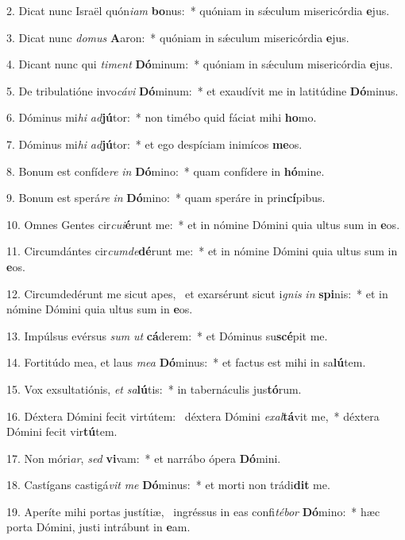 2. Dicat nunc Israël quón\textit{i}\textit{am} \textbf{bo}nus:~*  quóniam in sǽculum misericórdia \textbf{e}jus.\

3. Dicat nunc \textit{do}\textit{mus} \textbf{A}aron:~*  quóniam in sǽculum misericórdia \textbf{e}jus.\

4. Dicant nunc qui \textit{ti}\textit{ment} \textbf{Dó}minum:~*  quóniam in sǽculum misericórdia \textbf{e}jus.\

5. De tribulatióne invo\textit{cá}\textit{vi} \textbf{Dó}minum:~*  et exaudívit me in latitúdine \textbf{Dó}minus.\

6. Dóminus mi\textit{hi} \textit{ad}\textbf{jú}tor:~*  non timébo quid fáciat mihi \textbf{ho}mo.\

7. Dóminus mi\textit{hi} \textit{ad}\textbf{jú}tor:~*  et ego despíciam inimícos \textbf{me}os.\

8. Bonum est confíde\textit{re} \textit{in} \textbf{Dó}mino:~*  quam confídere in \textbf{hó}mine.\

9. Bonum est sperá\textit{re} \textit{in} \textbf{Dó}mino:~*  quam speráre in prin\textbf{cí}pibus.\

10. Omnes Gentes cir\textit{cu}\textit{i}\textbf{é}runt me:~*  et in nómine Dómini quia ultus sum in \textbf{e}os.\

11. Circumdántes cir\textit{cum}\textit{de}\textbf{dé}runt me:~*  et in nómine Dómini quia ultus sum in \textbf{e}os.\

12. Circumdedérunt me sicut apes, \dag\  et exarsérunt sicut i\textit{gnis} \textit{in} \textbf{spi}nis:~*  et in nómine Dómini quia ultus sum in \textbf{e}os.\

13. Impúlsus evérsus \textit{sum} \textit{ut} \textbf{cá}derem:~*  et Dóminus su\textbf{scé}pit me.\

14. Fortitúdo mea, et laus \textit{me}\textit{a} \textbf{Dó}minus:~*  et factus est mihi in sa\textbf{lú}tem.\

15. Vox exsultatiónis, \textit{et} \textit{sa}\textbf{lú}tis:~*  in tabernáculis jus\textbf{tó}rum.\

16. Déxtera Dómini fecit virtútem: \dag\  déxtera Dómini \textit{ex}\textit{al}\textbf{tá}vit me,~*  déxtera Dómini fecit vir\textbf{tú}tem.\

17. Non móri\textit{ar}, \textit{sed} \textbf{vi}vam:~*  et narrábo ópera \textbf{Dó}mini.\

18. Castígans castigá\textit{vit} \textit{me} \textbf{Dó}minus:~*  et morti non trádi\textbf{dit} me.\

19. Aperíte mihi portas justítiæ, \dag\  ingréssus in eas confi\textit{té}\textit{bor} \textbf{Dó}mino:~*  hæc porta Dómini, justi intrábunt in \textbf{e}am.\


